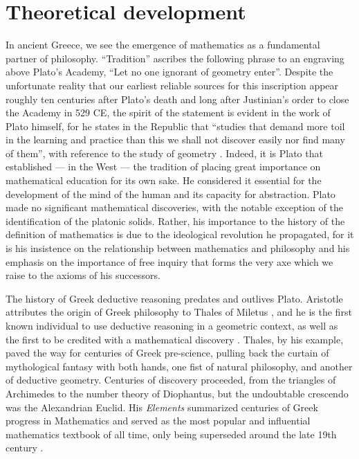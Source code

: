 \documentclass[12pt]{article}
\begin{document}

\section{Theoretical development}

In ancient Greece,
we see the emergence of mathematics
as a fundamental partner of philosophy.
``Tradition'' ascribes the following phrase
to an engraving above Plato's Academy,
``Let no one ignorant of geometry enter''.
Despite the unfortunate reality that
our earliest reliable sources for this inscription
appear roughly ten centuries after Plato's death \cite{plato_truth}
and long after Justinian's order to close
the Academy in 529 CE, 
the spirit of the statement is evident
in the work of Plato himself,
for he states in the Republic that
``studies that demand more toil
in the learning and practice than this
we shall not discover easily
nor find many of them'',
with reference to
the study of geometry \cite{plato}.
Indeed, it is Plato that established ---
in the West ---
the tradition of placing great importance
on mathematical education
for its own sake.
He considered it essential
for the development
of the mind of the human
and its capacity for abstraction.
Plato made no significant mathematical discoveries,
with the notable exception of the identification
of the platonic solids.
Rather, his importance to
the history of the definition of mathematics
is due to the ideological revolution he propagated,
for it is his insistence on the relationship between
mathematics and philosophy
and his emphasis on the importance of free inquiry
that forms the very axe which we raise
to the axioms of his successors.

The history of
Greek deductive reasoning
predates and outlives Plato.
Aristotle attributes
the origin of
Greek philosophy
to Thales of Miletus \cite{aristotle_thales},
and he is the first known
individual to use
deductive reasoning in a geometric context,
as well as the first to be credited
with a mathematical discovery \cite{boyer1991}.
Thales, by his example,
paved the way for centuries of Greek pre-science,
pulling back the curtain of mythological fantasy
with both hands,
one fist of natural philosophy,
and another of deductive geometry.
Centuries of discovery proceeded,
from the triangles of Archimedes
to the number theory of Diophantus,
but the undoubtable crescendo
was the Alexandrian Euclid.
His \textit{Elements} summarized
centuries of Greek progress in Mathematics
and served as the most popular
and influential mathematics textbook of all time,
only being superseded around the late 19th century \cite{boyer1991}.
\end{document}
